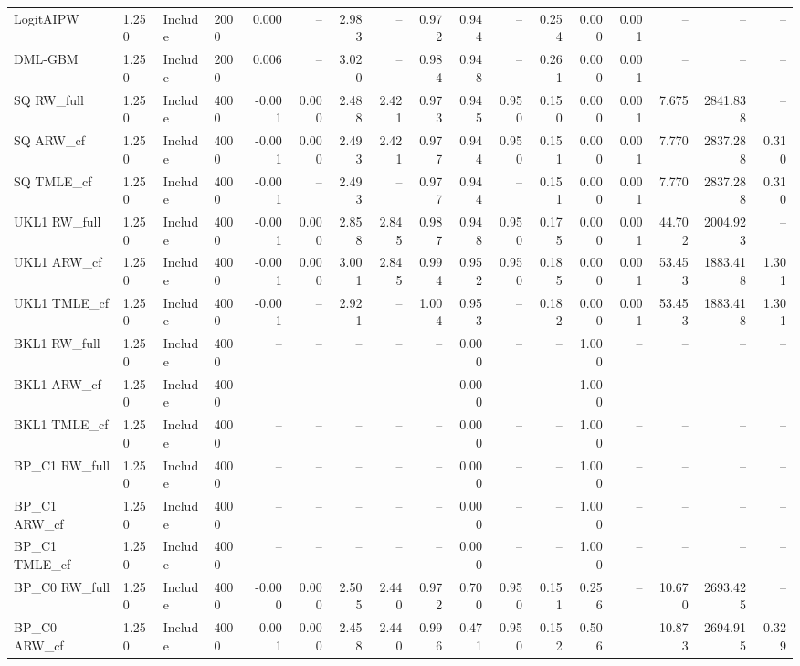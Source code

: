 \begin{tabular}{llllrrrrrrrrrrrrr}
LogitAIPW & 1.250 & Include & 2000 & 0.000 & -- & 2.983 & -- & 0.972 & 0.944 & -- & 0.254 & 0.000 & 0.001 & -- & -- & -- \\
DML-GBM & 1.250 & Include & 2000 & 0.006 & -- & 3.020 & -- & 0.984 & 0.948 & -- & 0.261 & 0.000 & 0.001 & -- & -- & -- \\
SQ RW\_full & 1.250 & Include & 4000 & -0.001 & 0.000 & 2.488 & 2.421 & 0.973 & 0.945 & 0.950 & 0.150 & 0.000 & 0.001 & 7.675 & 2841.838 & -- \\
SQ ARW\_cf & 1.250 & Include & 4000 & -0.001 & 0.000 & 2.493 & 2.421 & 0.977 & 0.944 & 0.950 & 0.151 & 0.000 & 0.001 & 7.770 & 2837.288 & 0.310 \\
SQ TMLE\_cf & 1.250 & Include & 4000 & -0.001 & -- & 2.493 & -- & 0.977 & 0.944 & -- & 0.151 & 0.000 & 0.001 & 7.770 & 2837.288 & 0.310 \\
UKL1 RW\_full & 1.250 & Include & 4000 & -0.001 & 0.000 & 2.858 & 2.845 & 0.987 & 0.948 & 0.950 & 0.175 & 0.000 & 0.001 & 44.702 & 2004.923 & -- \\
UKL1 ARW\_cf & 1.250 & Include & 4000 & -0.001 & 0.000 & 3.001 & 2.845 & 0.994 & 0.952 & 0.950 & 0.185 & 0.000 & 0.001 & 53.453 & 1883.418 & 1.301 \\
UKL1 TMLE\_cf & 1.250 & Include & 4000 & -0.001 & -- & 2.921 & -- & 1.004 & 0.953 & -- & 0.182 & 0.000 & 0.001 & 53.453 & 1883.418 & 1.301 \\
BKL1 RW\_full & 1.250 & Include & 4000 & -- & -- & -- & -- & -- & 0.000 & -- & -- & 1.000 & -- & -- & -- & -- \\
BKL1 ARW\_cf & 1.250 & Include & 4000 & -- & -- & -- & -- & -- & 0.000 & -- & -- & 1.000 & -- & -- & -- & -- \\
BKL1 TMLE\_cf & 1.250 & Include & 4000 & -- & -- & -- & -- & -- & 0.000 & -- & -- & 1.000 & -- & -- & -- & -- \\
BP\_C1 RW\_full & 1.250 & Include & 4000 & -- & -- & -- & -- & -- & 0.000 & -- & -- & 1.000 & -- & -- & -- & -- \\
BP\_C1 ARW\_cf & 1.250 & Include & 4000 & -- & -- & -- & -- & -- & 0.000 & -- & -- & 1.000 & -- & -- & -- & -- \\
BP\_C1 TMLE\_cf & 1.250 & Include & 4000 & -- & -- & -- & -- & -- & 0.000 & -- & -- & 1.000 & -- & -- & -- & -- \\
BP\_C0 RW\_full & 1.250 & Include & 4000 & -0.000 & 0.000 & 2.505 & 2.440 & 0.972 & 0.700 & 0.950 & 0.151 & 0.256 & -- & 10.670 & 2693.425 & -- \\
BP\_C0 ARW\_cf & 1.250 & Include & 4000 & -0.001 & 0.000 & 2.458 & 2.440 & 0.996 & 0.471 & 0.950 & 0.152 & 0.506 & -- & 10.873 & 2694.915 & 0.329 \\

\end{tabular}
